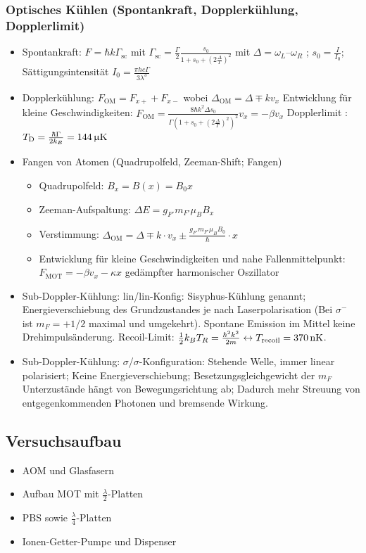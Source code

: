 \documentclass[10pt,a4paper]{extarticle}
\begin{document}
\subsubsection*{Optisches Kühlen (Spontankraft, Dopplerkühlung, Dopplerlimit)}
\begin{itemize}
\item Spontankraft: $F = \hbar k \Gamma_{\text{sc}}$ mit $\Gamma_{\text{sc}} =  \frac{\Gamma}{2} \frac{s_0}{1+s_0+\left(2\frac{\Delta}{\Gamma}\right)^2}$ mit $\Delta = \omega_L – \omega_R$ ; $s_0= \frac{I}{I_0}$; Sättigungsintensität $I_0=\frac{\pi h c \Gamma}{3\lambda^3}$
\item Dopplerkühlung: $F_{\text{OM}} = F_{x+} + F_{x-}$ wobei $\Delta_{\text{OM}} = \Delta \mp k v_x$
Entwicklung für kleine Geschwindigkeiten: $F_{\text{OM}} = \frac{8 \hbar k^2 \Delta s_0}{\Gamma \left(1+s_0 + \left(2 \frac{\Delta}{\Gamma}\right)^2\right)^2} v_x = -\beta v_x $
Dopplerlimit : $T_{\text{D}} = \frac{\hbar \Gamma}{2 k_B} = \unit[144]{\upmu K}$
\item Fangen von Atomen (Quadrupolfeld, Zeeman-Shift; Fangen)
\begin{itemize}
\item Quadrupolfeld:  $B_x = B(x) = B_0 x$
\item Zeeman-Aufspaltung: $\Delta E = g_{F'} m_{F'} \mu_B B_x$
\item Verstimmung: $\Delta_{\text{OM}} = \Delta \mp k \cdot v_x \pm \frac{g_{F'} m_{F'} \mu_B B_0}{\hbar} \cdot x$
\item Entwicklung für kleine Geschwindigkeiten und nahe Fallenmittelpunkt: $F_{\text{MOT}} = - \beta v_x - \kappa x$ gedämpfter harmonischer Oszillator
\end{itemize}
\item Sub-Doppler-Kühlung: lin/lin-Konfig: Sisyphus-Kühlung genannt; Energieverschiebung des Grundzustandes je nach Laserpolarisation (Bei $\sigma^-$ ist $m_F=+1/2$ maximal und umgekehrt). Spontane Emission im Mittel keine Drehimpulsänderung. Recoil-Limit: $\frac{1}{2} k_B T_R = \frac{\hbar^2 k^2}{2m} \leftrightarrow T_{\mathrm{recoil}} = \unit[370]{nK}$.
\item Sub-Doppler-Kühlung: $\sigma$/$\sigma$-Konfiguration: Stehende Welle, immer linear polarisiert; Keine Energieverschiebung; Besetzungsgleichgewicht der $m_F$ Unterzustände hängt von Bewegungsrichtung ab; Dadurch mehr Streuung von entgegenkommenden Photonen und bremsende Wirkung.
\end{itemize}

\subsection*{Versuchsaufbau}
\begin{itemize}
\item AOM und Glasfasern
\item Aufbau MOT mit $\frac{\lambda}{2}$-Platten
\item PBS sowie $\frac{\lambda}{4}$-Platten 
\item Ionen-Getter-Pumpe und Dispenser
\end{itemize}
\end{document}
